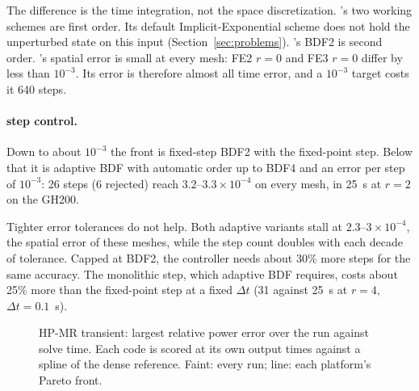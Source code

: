 The difference is the time integration, not the space discretization. \ffn's
two working schemes are first order. Its default Implicit-Exponential scheme
does not hold the unperturbed state on this input
(Section~\ref{sec:problems}). \garnet's BDF2 is second order. \ffn's spatial
error is small at every mesh: FE2 $r=0$ and FE3 $r=0$ differ by less than
$10^{-3}$. Its error is therefore almost all time error, and a $10^{-3}$
target costs it 640 steps.

\paragraph{\garnet{} step control.} Down to about $10^{-3}$ the front is
fixed-step BDF2 with the fixed-point step. Below that it is adaptive BDF with
automatic order up to BDF4 and an error per step of $10^{-3}$: 26 steps
(6 rejected) reach $3.2$--$3.3 \times 10^{-4}$ on every mesh, in 25~s at
$r=2$ on the GH200.

Tighter error tolerances do not help. Both adaptive variants stall at
$2.3$--$3 \times 10^{-4}$, the spatial error of these meshes, while the step
count doubles with each decade of tolerance. Capped at BDF2, the controller
needs about 30\% more steps for the same accuracy. The monolithic step,
which adaptive BDF requires, costs about 25\% more than the fixed-point step
at a fixed $\Delta t$ (31 against 25~s at $r=4$, $\Delta t = 0.1$~s).

\begin{figure}[h]
\caption{HP-MR transient: largest relative power error over the run against
solve time. Each code is scored at its own output times against a spline of
the dense reference. Faint: every run; line: each platform's Pareto front.}
\label{fig:transient}
\end{figure}
